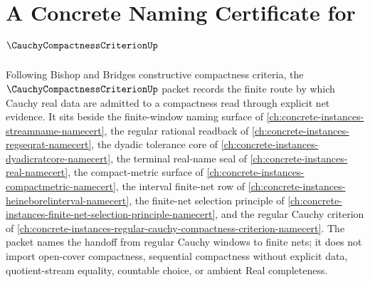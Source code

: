 \chapter{A Concrete Naming Certificate for $\CauchyCompactnessCriterionUp$}
\label{ch:concrete-instances-cauchy-compactness-criterion-namecert}

Following Bishop and Bridges constructive compactness criteria, the $\CauchyCompactnessCriterionUp$ packet records the finite route by which Cauchy real data are admitted to a compactness read through explicit net evidence. It sits beside the finite-window naming surface of \autoref{ch:concrete-instances-streamname-namecert}, the regular rational readback of \autoref{ch:concrete-instances-regseqrat-namecert}, the dyadic tolerance core of \autoref{ch:concrete-instances-dyadicratcore-namecert}, the terminal real-name seal of \autoref{ch:concrete-instances-real-namecert}, the compact-metric surface of \autoref{ch:concrete-instances-compactmetric-namecert}, the interval finite-net row of \autoref{ch:concrete-instances-heineborelinterval-namecert}, the finite-net selection principle of \autoref{ch:concrete-instances-finite-net-selection-principle-namecert}, and the regular Cauchy criterion of \autoref{ch:concrete-instances-regular-cauchy-compactness-criterion-namecert}. The packet names the handoff from regular Cauchy windows to finite nets; it does not import open-cover compactness, sequential compactness without explicit data, quotient-stream equality, countable choice, or ambient Real completeness.


